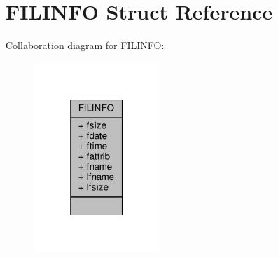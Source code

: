 \hypertarget{structFILINFO}{\section{F\+I\+L\+I\+N\+F\+O Struct Reference}
\label{structFILINFO}
}


Collaboration diagram for F\+I\+L\+I\+N\+F\+O\+:
\nopagebreak
\begin{figure}[H]
\begin{center}
\leavevmode
\includegraphics[width=135pt]{structFILINFO__coll__graph}
\end{center}
\end{figure}
